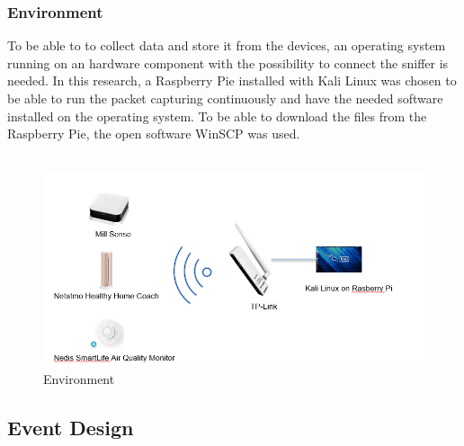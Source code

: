 \subsubsection{Environment}
To be able to to collect data and store it from the devices, an operating system running on an hardware component with the possibility to connect the sniffer is needed. In this research, a Raspberry Pie installed with Kali Linux was chosen to be able to run the packet capturing continuously and have the needed software installed on the operating system. To be able to download the files from the Raspberry Pie, the open software WinSCP was used. 
\\\\
\begin{figure} [!ht]
    \centering
    \includegraphics[width=1\textwidth]{figures/Environment.png}
    \caption{Environment}
    \label{fig:Environment}
\end{figure}

\subsection{Event Design}
